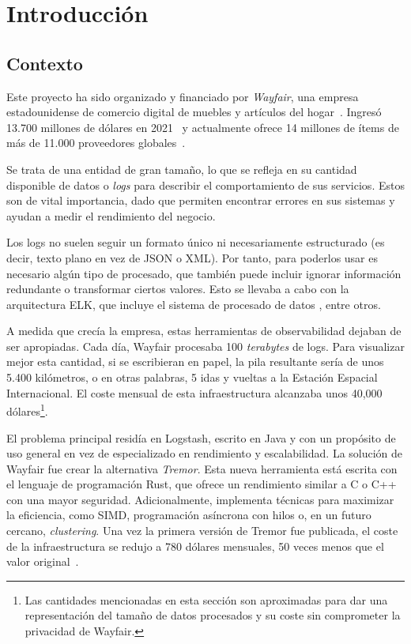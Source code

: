 
\chapter{Introducción}

\section{Contexto}

Este proyecto ha sido organizado y financiado por \emph{Wayfair}, una empresa
estadounidense de comercio digital de muebles y artículos del
hogar~\cite{wayfair}. Ingresó 13.700 millones de dólares en
2021~\cite{wayfairRevenue} y actualmente ofrece 14 millones de ítems de más de
11.000 proveedores globales~\cite{wayfairItems}.

Se trata de una entidad de gran tamaño, lo que se refleja en su cantidad
disponible de datos o \emph{logs} para describir el comportamiento de sus
servicios. Estos son de vital importancia, dado que permiten encontrar errores
en sus sistemas y ayudan a medir el rendimiento del negocio.

Los logs no suelen seguir un formato único ni necesariamente estructurado (es
decir, texto plano en vez de JSON o XML). Por tanto, para poderlos usar es
necesario algún tipo de procesado, que también puede incluir ignorar información
redundante o transformar ciertos valores. Esto se llevaba a cabo con la
arquitectura ELK, que incluye el sistema de procesado de datos
, entre otros.

A medida que crecía la empresa, estas herramientas de observabilidad dejaban de
ser apropiadas. Cada día, Wayfair procesaba 100 \emph{terabytes} de logs. Para
visualizar mejor esta cantidad, si se escribieran en papel, la pila resultante
sería de unos 5.400 kilómetros, o en otras palabras, 5 idas y vueltas a la
Estación Espacial Internacional. El coste mensual de esta infraestructura
alcanzaba unos 40,000 dólares\footnote{Las cantidades mencionadas en esta
sección son aproximadas para dar una representación del tamaño de datos
procesados y su coste sin comprometer la privacidad de Wayfair.}.

El problema principal residía en Logstash, escrito en Java y con un propósito de
uso general en vez de especializado en rendimiento y escalabilidad. La solución
de Wayfair fue crear la alternativa \emph{Tremor}. Esta nueva herramienta está
escrita con el lenguaje de programación Rust, que ofrece un rendimiento similar
a C o C++ con una mayor seguridad. Adicionalmente, implementa técnicas para
maximizar la eficiencia, como SIMD, programación asíncrona con hilos o, en un
futuro cercano, \emph{clustering}. Una vez la primera versión de Tremor fue
publicada, el coste de la infraestructura se redujo a 780 dólares mensuales, 50
veces menos que el valor original~\cite{tremorcon_lll}.

